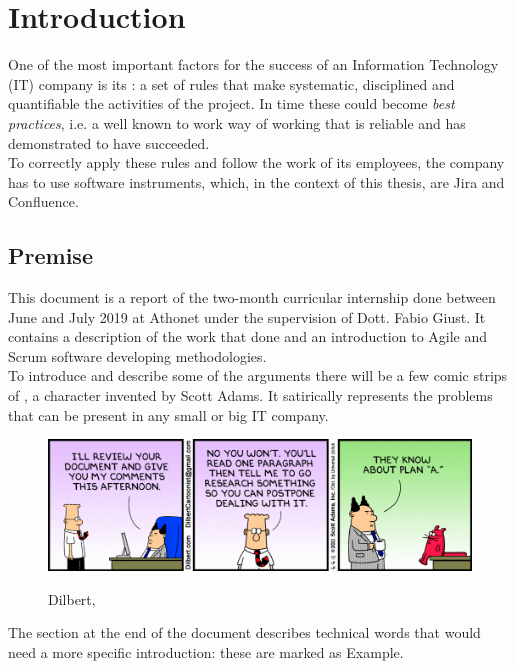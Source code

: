 \chapter{Introduction}
\label{introduction}
One of the most important factors for the success of an Information Technology (IT) company is its : a set of rules that make systematic, disciplined and quantifiable the activities of the project.
In time these could become \textit{best practices}, i.e. a well known to work way of working that is reliable and has demonstrated to have succeeded.\\
To correctly apply these rules and follow the work of its employees, the company has to use software instruments, which, in the context of this thesis, are Jira and Confluence.

\section{Premise}
	This document is a report of the two-month curricular internship done between June and July 2019 at Athonet under the supervision of Dott. Fabio Giust.
	It contains a description of the work that done and an introduction to Agile and Scrum software developing methodologies.\\
	To introduce and describe some of the arguments there will be a few comic strips of , a character invented by Scott Adams\cite{dilbert}.
	It satirically represents the problems that can be present in any small or big IT company.
	\begin{figure}[H]
		\centering
		\includegraphics[width=1\textwidth]{resources/Dissertate}\\
		\caption[Dilbert, ]{Dilbert, }
	\end{figure}
	The  section at the end of the document describes technical words that would need a more specific introduction: these are marked as \gls{Example}.\\
	

